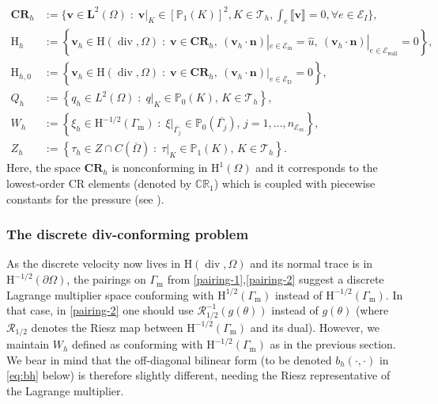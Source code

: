 \documentclass[onefignum,onetabnum,reqno,a4paper,final]{siamart250211}
\def\O{\Omega}
\newcommand{\jump}[1]{\llbracket #1 \rrbracket}
\newcommand\bv{\boldsymbol{v}}
\newcommand\bn{\boldsymbol{n}}
\newcommand\bL{\mathbf{L}}
\newcommand\0{\mathbf{0}}
\newcommand\CE{\mathcal{E}}
\def\CT{{\mathcal T}}
\renewcommand\H{\mathrm{H}}
\newcommand\bH{\boldsymbol{\mathrm{H}}}
\renewcommand\O{\Omega}
\newcommand\Gm{\Gamma_{\mathrm{m}}}
\renewcommand\div{\mathop{\mathrm{div}}\nolimits}
\numberwithin{figure}{section}
\numberwithin{table}{section}
\begin{document}
    \[
	\begin{aligned}
        \mathbf{CR}_h&:=\{\bv\in \bL^2(\Omega)\;:\; \bv\vert_K\in [\mathbb{P}_1(K)]^2, K\in\CT_h, \int_e \jump{\bv} =0, \forall e\in\CE_I\}, \\
		\bH_h& :=\left\{\bv_h\in \H(\div,\O)\;:\; \bv\in\mathbf{CR}_h  ,{ \ (\bv_h\cdot \bn)|_{e\in\CE_{\mathrm{in}}} = \widehat{u},\ (\bv_h\cdot \bn)|_{e\in\CE_{\mathrm{wall}}} = 0} \right\},\\
        \bH_{h,0}& :=\left\{\bv_h\in \H(\div,\O)\;:\; \bv\in\mathbf{CR}_h ,{ \ (\bv_h\cdot \bn)|_{e\in\CE_{\mathrm{D}}} =  0} \right\},\\
		Q_h &:=\left\{q_h\in L^2(\Omega)\;:\; q\vert_K\in\mathbb{P}_0(K),\,K\in\CT_h \right\},\\
		W_h &:=\left\{\xi_h\in {\H^{-1/2}(\Gm)}  
		\;:\; \xi\vert_{\overline{\Gamma_j}}\in\mathbb{P}_0(\overline{\Gamma_j}),\, j=1,\ldots,n_{\mathcal{E}_m} \right\},\\
		Z_h & :=\left\{\tau_h\in Z\cap C(\overline{\O})\;:\; \tau\vert_K\in\mathbb{P}_{1}(K),\,K\in\CT_h \right\}.
	\end{aligned}\]
Here, the space $\mathbf{CR}_h$ is nonconforming in $\bH^1(\Omega)$ and it corresponds to the lowest-order CR elements (denoted by $\mathbb{CR}_{1}$) which is coupled with piecewise constants for the pressure (see \cite{crouzeix1973conforming,girault1979finite}).
 

 \subsubsection{The discrete div-conforming problem}\label{subsec:BDM-RT-model-and-properties}
 As the discrete velocity now lives in $\H(\div,\O)$ and its normal trace is in $\H^{-1/2}(\partial\Omega)$, the pairings on $\Gm$ from \eqref{pairing-1},\eqref{pairing-2} suggest a discrete Lagrange multiplier space  conforming with $\H^{1/2}(\Gm)$ instead of $\H^{-1/2}(\Gm)$. In that case, in \eqref{pairing-2} one should use $\mathcal{R}^{-1}_{1/2}(g(\theta))$ instead of $g(\theta)$ (where $\mathcal{R}_{1/2}$ denotes the Riesz map between $\H^{-1/2}(\Gm)$ and its dual). However, we maintain  $W_h$ defined as conforming with $\H^{-1/2}(\Gm)$ as in the previous section. We bear in mind that the off-diagonal bilinear form (to be denoted $b_h(\cdot,\cdot)$ in \eqref{eq:bh} below) is therefore slightly different, needing   the Riesz representative  of the Lagrange multiplier.

	
	
\end{document}
